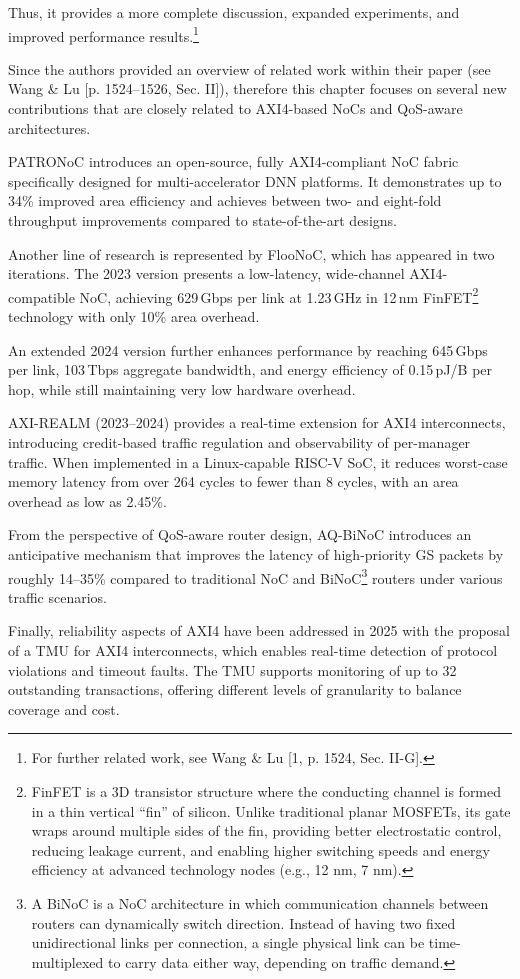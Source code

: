 Thus, it provides a more complete discussion, expanded experiments, and improved performance results.\footnote{For further related work, see Wang \& Lu [1, p. 1524, Sec. II-G].} 
\fi

Since the authors provided an overview of related work within their paper (see Wang \& Lu [p. 1524--1526, Sec. II]), therefore this chapter focuses on several new contributions that are closely related to AXI4-based NoCs and QoS-aware architectures.

PATRONoC introduces an open-source, fully AXI4-compliant NoC fabric specifically designed for multi-accelerator \ac{DNN} platforms. It demonstrates up to 34\% improved area efficiency and achieves between two- and eight-fold throughput improvements compared to state-of-the-art designs.\cite{jain_patronoc_2023} 

Another line of research is represented by FlooNoC, which has appeared in two iterations. The 2023 version presents a low-latency, wide-channel AXI4-compatible NoC, achieving 629\,Gbps per link at 1.23\,GHz in 12\,nm \ac{FinFET}\footnote{FinFET is a 3D transistor structure where the conducting channel is formed in a thin vertical “fin” of silicon. Unlike traditional planar MOSFETs, its gate wraps around multiple sides of the fin, providing better electrostatic control, reducing leakage current, and enabling higher switching speeds and energy efficiency at advanced technology nodes (e.g., 12 nm, 7 nm).} technology with only 10\% area overhead.\cite{fischer_floonoc_2023} 

An extended 2024 version further enhances performance by reaching 645\,Gbps per link, 103\,Tbps aggregate bandwidth, and energy efficiency of 0.15\,pJ/B per hop, while still maintaining very low hardware overhead.\cite{fischer_floonoc_2025}

AXI-REALM (2023--2024) provides a real-time extension for AXI4 interconnects, introducing credit-based traffic regulation and observability of per-manager traffic. When implemented in a Linux-capable RISC-V SoC, it reduces worst-case memory latency from over 264 cycles to fewer than 8 cycles, with an area overhead as low as 2.45\%.\cite{benz_axi-realm_2023}\cite{benz_axi-realm_2025}

From the perspective of QoS-aware router design, AQ-BiNoC introduces an anticipative mechanism that improves the latency of high-priority \ac{GS} packets by roughly 14--35\% compared to traditional NoC and \ac{BiNoC}\footnote{A BiNoC is a NoC architecture in which communication channels between routers can dynamically switch direction. Instead of having two fixed unidirectional links per connection, a single physical link can be time-multiplexed to carry data either way, depending on traffic demand.} routers under various traffic scenarios.\cite{tsai_anticipative_2022} 

Finally, reliability aspects of AXI4 have been addressed in 2025 with the proposal of a \ac{TMU} for AXI4 interconnects, which enables real-time detection of protocol violations and timeout faults. The \ac{TMU} supports monitoring of up to 32 outstanding transactions, offering different levels of granularity to balance coverage and cost.\cite{liang_towards_2025}
